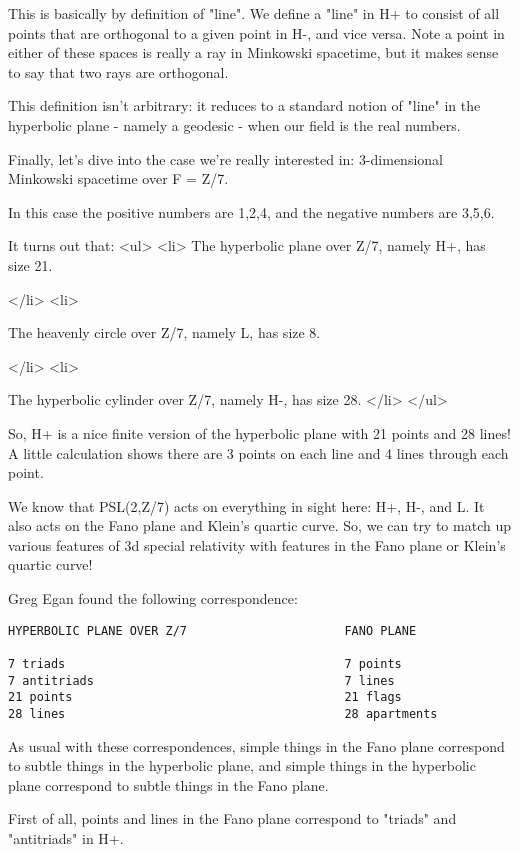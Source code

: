This is basically by definition of "line".  We define a "line" in H+ to consist 
of all points that are orthogonal to a given point in H-, and vice versa.
Note a point in either of these spaces is really a ray in Minkowski spacetime, 
but it makes sense to say that two rays are orthogonal.  


This definition isn't arbitrary: it reduces to a standard notion of "line" in
the hyperbolic plane - namely a geodesic - when our field is the real numbers.


Finally, let's dive into the case we're really interested in: 
3-dimensional Minkowski spacetime over F = Z/7.


In this case the positive numbers are 1,2,4, and the negative numbers
are 3,5,6.  

It turns out that:
<ul>
<li>
 The hyperbolic plane over Z/7, namely H+, has size 21.  

</li>
<li>

 The heavenly circle over Z/7, namely L, has size 8.

</li>
<li>

 The hyperbolic cylinder over Z/7, namely H-, has size 28.   
</li>
</ul>

So, H+ is a nice finite version of the hyperbolic plane with 21 points and 
28 lines!  A little calculation shows there are 3 points on each line and 
4 lines through each point.

We know that PSL(2,Z/7) acts on everything in sight here: H+, H-, and L.  
It also acts on the Fano plane and Klein's quartic curve.  So, we can try to 
match up various features of 3d special relativity with features in the Fano 
plane or Klein's quartic curve!

Greg Egan found the following correspondence:
\begin{verbatim}
HYPERBOLIC PLANE OVER Z/7                      FANO PLANE    

7 triads                                       7 points  
7 antitriads                                   7 lines       
21 points                                      21 flags     
28 lines                                       28 apartments 
\end{verbatim}
    
As usual with these correspondences, simple things in the Fano plane correspond 
to subtle things in the hyperbolic plane, and simple things in the hyperbolic 
plane correspond to subtle things in the Fano plane.

First of all, points and lines in the Fano plane correspond to "triads" and 
"antitriads" in H+.

